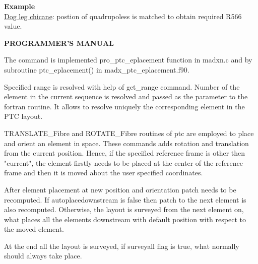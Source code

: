 \textbf{Example }\\

\href{http://cern.ch/frs/mad-X_examples/ptc_madx_interface/eplacement/chicane.madx}{Dog
  leg chicane}: postion of quadrupoless is matched to obtain required
R566 value.   


{\bf PROGRAMMER'S MANUAL}

The command is implemented pro\_ptc\_eplacement function in madxn.c and
by subroutine ptc\_eplacement() in madx\_ptc\_eplacement.f90.  

Specified range is resolved with help of get\_range command. Number of
the element in the current sequence is resolved and passed as the
parameter to the fortran routine. It allows to resolve uniquely the
corresponding element in the PTC layout.  

TRANSLATE\_Fibre and ROTATE\_Fibre routines of ptc are employed to place
and orient an element in space. These commands adds rotation and
translation from the current position. Hence, if the specified reference
frame is other then "current", the element firstly needs to be placed at
the center of the reference frame and then it is moved about the user
specified coordinates.   

After element placement at new position and orientation patch needs to
be recomputed. If autoplacedownstream is false then patch to the next
element is also recomputed. Otherwise, the layout is surveyed from the
next element on, what places all the elements downstream with default
position with respect to the moved element.  

At the end all the layout is surveyed, if surveyall flag is true, what
normally should always take place.      


